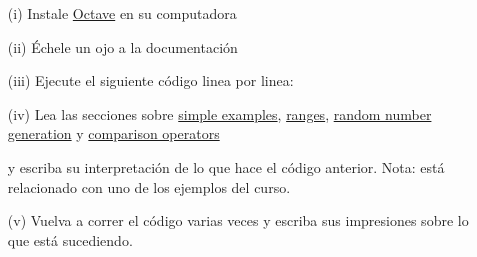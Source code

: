 \begin{problema}
	\begin{enumerate}
		\item[(i)] 
			Instale \href{www.octave.org}{Octave} en su computadora
		\item[(ii)] 
			\'Echele un ojo a la documentaci\'on
		\item[(iii)] 
			Ejecute el siguiente c\'odigo linea por linea: 
		\item[(iv)] 
			Lea las secciones sobre 
			\href{http://www.gnu.org/software/octave/doc/interpreter/Simple-Examples.html#Simple-Examples}{simple examples}, 
			\href{http://www.gnu.org/software/octave/doc/interpreter/Ranges.html#Ranges}{ranges}, 
			\href{http://www.gnu.org/software/octave/doc/interpreter/Random-Number-Generation.html#Random-Number-Generation}{random number generation} 
			y 
			\href{http://www.gnu.org/software/octave/doc/interpreter/Comparison-Ops.html#Comparison-Ops}{comparison operators} 
			
			y escriba su interpretaci\'on de lo que hace el c\'odigo anterior. Nota: est\'a relacionado con uno de los ejemplos del curso.
		\item[(v)] 
			Vuelva a correr el c\'odigo varias veces y escriba sus impresiones sobre lo que est\'a sucediendo.
	\end{enumerate}
\end{problema}
